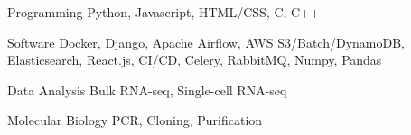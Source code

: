 

\begin{cvskills}

  \cvskill
    {Programming} %
    {Python, Javascript, HTML/CSS, C, C++} %

  \cvskill
    {Software} %
    {Docker, Django, Apache Airflow, AWS S3/Batch/DynamoDB, Elasticsearch, React.js, CI/CD, Celery, RabbitMQ, Numpy, Pandas} %

  \cvskill
    {Data Analysis} %
    {Bulk RNA-seq, Single-cell RNA-seq} %

  \cvskill
    {Molecular Biology} %
    {PCR, Cloning, Purification} %

\end{cvskills}
